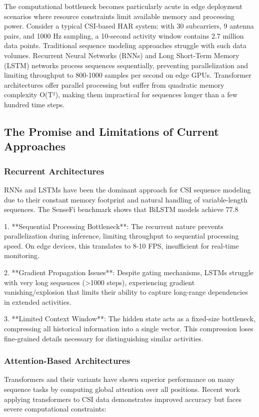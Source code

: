 \documentclass[10pt,journal,compsoc]{IEEEtran}
\begin{document}
The computational bottleneck becomes particularly acute in edge deployment scenarios where resource constraints limit available memory and processing power. Consider a typical CSI-based HAR system: with 30 subcarriers, 9 antenna pairs, and 1000 Hz sampling, a 10-second activity window contains 2.7 million data points. Traditional sequence modeling approaches struggle with such data volumes. Recurrent Neural Networks (RNNs) and Long Short-Term Memory (LSTM) networks process sequences sequentially, preventing parallelization and limiting throughput to 800-1000 samples per second on edge GPUs. Transformer architectures offer parallel processing but suffer from quadratic memory complexity O(T²), making them impractical for sequences longer than a few hundred time steps.

\subsection{The Promise and Limitations of Current Approaches}

\subsubsection{Recurrent Architectures}
RNNs and LSTMs have been the dominant approach for CSI sequence modeling due to their constant memory footprint and natural handling of variable-length sequences. The SenseFi benchmark \cite{yang2023sensefi} shows that BiLSTM models achieve 77.8%

1. **Sequential Processing Bottleneck**: The recurrent nature prevents parallelization during inference, limiting throughput to sequential processing speed. On edge devices, this translates to 8-10 FPS, insufficient for real-time monitoring.

2. **Gradient Propagation Issues**: Despite gating mechanisms, LSTMs struggle with very long sequences (>1000 steps), experiencing gradient vanishing/explosion that limits their ability to capture long-range dependencies in extended activities.

3. **Limited Context Window**: The hidden state acts as a fixed-size bottleneck, compressing all historical information into a single vector. This compression loses fine-grained details necessary for distinguishing similar activities.

\subsubsection{Attention-Based Architectures}
Transformers and their variants have shown superior performance on many sequence tasks by computing global attention over all positions. Recent work applying transformers to CSI data demonstrates improved accuracy but faces severe computational constraints:
\end{document}
